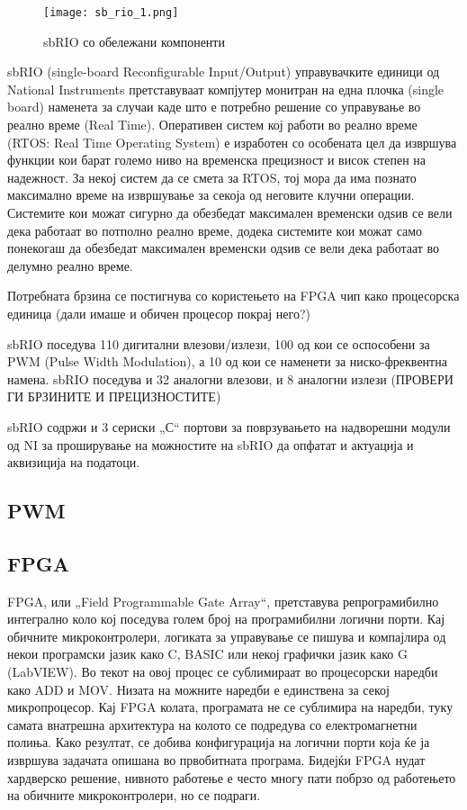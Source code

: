 \documentclass{article}
\begin{document}
\begin{figure}[h]
\texttt{[image: sb\_rio\_1.png]}
\caption{sbRIO со обележани компоненти}
\label{fig:sb_rio_1.png}
\centering
\end{figure}
sbRIO (single-board Reconfigurable Input/Output) управувачките единици од National Instruments претставуваат компјутер монитран на една плочка (single board) наменета за случаи каде што е потребно решение со управување во реално време (Real Time). Оперативен систем кој работи во реално време (RTOS: Real Time Operating System) е изработен со особената цел да извршува функции кои барат големо ниво на временска прецизност и висок степен на надежност. За некој систем да се смета за RTOS, тој мора да има познато максимално време на извршување за секоја од неговите клучни операции. Системите кои можат сигурно да обезбедат максимален временски одѕив се вели дека работаат во потполно реално време, додека системите кои можат само понекогаш да обезбедат максимален временски одѕив се вели дека работаат во делумно реално време.  
 
Потребната брзина се постигнува со користењето на FPGA чип како процесорска единица (дали имаше и обичен процесор покрај него?)

sbRIO поседува 110 дигитални влезови/излези, 100 од кои се оспособени за PWM (Pulse Width Modulation), а 10 од кои се наменети за ниско-фреквентна намена. sbRIO поседува и 32 аналогни влезови, и 8 аналогни излези (ПРОВЕРИ ГИ БРЗИНИТЕ И ПРЕЦИЗНОСТИТЕ)

sbRIO содржи и 3 сериски „С“ портови за поврзувањето на надворешни модули од NI за проширување на можностите на sbRIO да опфатат и актуација и аквизиција на податоци.
\subsection{PWM}

\subsection{FPGA}
FPGA, или „Field Programmable Gate Array“, претставува репрограмибилно интегрално коло кој поседува голем број на програмибилни логични порти. Кај обичните микроконтролери, логиката за управување се пишува и компајлира од некои програмски јазик како C, BASIC или некој графички јазик како G (LabVIEW). Во текот на овој процес се сублимираат во процесорски наредби како ADD и MOV. Низата на можните наредби е единствена за секој микропроцесор. Кај FPGA колата, програмата не се сублимира на наредби, туку самата внатрешна архитектура на колото се подредува со електромагнетни полиња. Како резултат, се добива конфигурација на логични порти која ќе ја извршува задачата опишана во првобитната програма. Бидејќи FPGA нудат хардверско решение, нивното работење е често многу пати побрзо од работењето на обичните микроконтролери, но се подраги.  
\end{document}
